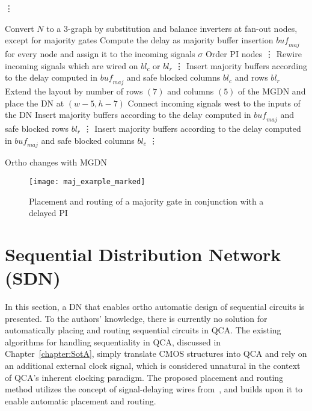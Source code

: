 \begin{algorithm}[t!]
	\vdots
	
	\begin{algorithmic}
		\State Convert $N$ to a 3-graph by substitution and balance inverters at fan-out nodes, except for majority gates
		\State Compute the delay as majority buffer insertion $\mathit{buf_{maj}}$ for every node and assign it to the incoming signals $\sigma$
		\State Order PI nodes
		\State \vdots
		\State Rewire incoming signals which are wired on $bl_c$ or $bl_r$
		\State \vdots
		\EndIf
		\State Insert majority buffers according to the delay computed in $\mathit{buf_{maj}}$ and safe blocked columns $bl_c$ and rows $bl_r$
		\State Extend the layout by number of rows $(7)$ and columns $(5)$ of the MGDN and place the DN at $(w-5, h-7)$
		\State Connect incoming signals west to the inputs of the DN
		\State Insert majority buffers according to the delay computed in $\mathit{buf_{maj}}$ and safe blocked rows $bl_r$
		\State \vdots
		\State Insert majority buffers according to the delay computed in $\mathit{buf_{maj}}$ and safe blocked columns $bl_c$
		\State \vdots
		\EndIf
		
		\EndFor
	\end{algorithmic}
	\caption{Ortho changes with MGDN}\label{alg:majority_network}
\end{algorithm}

\begin{figure}
	\centering
	\texttt{[image: maj\_example\_marked]}
	\caption{Placement and routing of a majority gate in conjunction with a delayed PI}\label{fig:majority_with_buf}
\end{figure}


\section{Sequential Distribution Network (SDN)}
In this section, a DN that enables ortho automatic design of sequential circuits is presented. To the authors' knowledge, there is currently no solution for automatically placing and routing sequential circuits in QCA. The existing algorithms for handling sequentiality in QCA, discussed in Chapter~\ref{chapter:SotA}, simply translate CMOS structures into QCA and rely on an additional external clock signal, which is considered unnatural in the context of QCA's inherent clocking paradigm. The proposed placement and routing method utilizes the concept of signal-delaying wires from~\cite{torres2018synchronization}, and builds upon it to enable automatic placement and routing.

